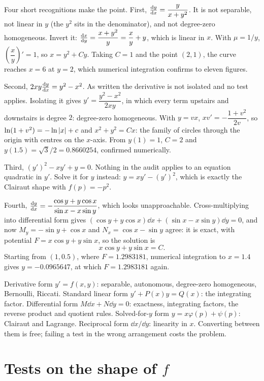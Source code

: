Four short recognitions make the point. First, $\frac{\mathrm{d}y}{\mathrm{d}x}=\dfrac{y}{x+y^{2}}$. It is not separable, not linear in $y$ (the $y^{2}$ sits in the denominator), and not degree-zero homogeneous. Invert it: $\frac{\mathrm{d}x}{\mathrm{d}y}=\dfrac{x+y^{2}}{y}=\dfrac xy+y$, which is linear in $x$. With $\mu=1/y$, $\left(\dfrac xy\right)'=1$, so $x=y^{2}+Cy$. Taking $C=1$ and the point $(2,1)$, the curve reaches $x=6$ at $y=2$, which numerical integration confirms to eleven figures.

Second, $2xy\frac{\mathrm{d}y}{\mathrm{d}x}=y^{2}-x^{2}$. As written the derivative is not isolated and no test applies. Isolating it gives $y'=\dfrac{y^{2}-x^{2}}{2xy}$, in which every term upstairs and downstairs is degree $2$: degree-zero homogeneous. With $y=vx$, $x v'=-\dfrac{1+v^{2}}{2v}$, so $\ln(1+v^{2})=-\ln\left\lvert x\right\rvert+c$ and $x^{2}+y^{2}=Cx$: the family of circles through the origin with centres on the $x$-axis. From $y(1)=1$, $C=2$ and $y(1.5)=\sqrt{3}/2=0.8660254$, confirmed numerically.

Third, $(y')^{2}-xy'+y=0$. Nothing in the audit applies to an equation quadratic in $y'$. Solve it for $y$ instead: $y=xy'-(y')^{2}$, which is exactly the Clairaut shape with $f(p)=-p^{2}$.

Fourth, $\frac{\mathrm{d}y}{\mathrm{d}x}=-\dfrac{\cos y+y\cos x}{\sin x-x\sin y}$, which looks unapproachable. Cross-multiplying into differential form gives $(\cos y+y\cos x)\dd x+(\sin x-x\sin y)\dd y=0$, and now $M_y=-\sin y+\cos x$ and $N_x=\cos x-\sin y$ agree: it is exact, with potential $F=x\cos y+y\sin x$, so the solution is
\[x\cos y+y\sin x=C.\]
Starting from $(1,0.5)$, where $F=1.2983181$, numerical integration to $x=1.4$ gives $y=-0.0965647$, at which $F=1.2983181$ again.

\begin{keynote}
Derivative form $y'=f(x,y)$: separable, autonomous, degree-zero homogeneous, Bernoulli, Riccati. Standard linear form $y'+P(x)y=Q(x)$: the integrating factor. Differential form $M\dd x+N\dd y=0$: exactness, integrating factors, the reverse product and quotient rules. Solved-for-$y$ form $y=x\varphi(p)+\psi(p)$: Clairaut and Lagrange. Reciprocal form $\dd x/\dd y$: linearity in $x$. Converting between them is free; failing a test in the wrong arrangement costs the problem.
\end{keynote}

\section{Tests on the shape of $f$}


